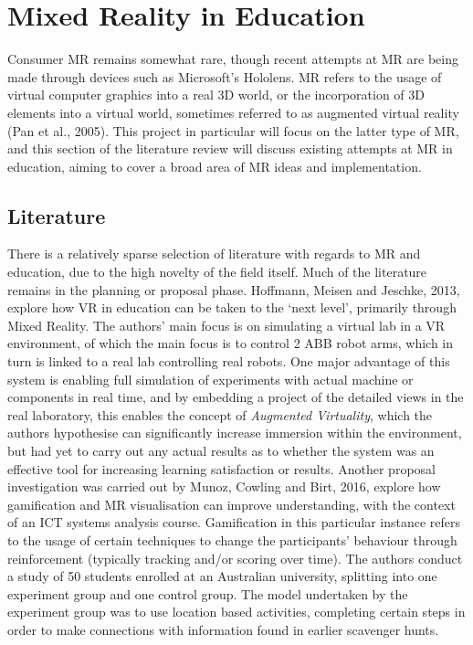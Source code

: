 \documentclass[11pt]{report}
\begin{document}
\section{Mixed Reality in Education}
Consumer MR remains somewhat rare, though recent attempts at MR are being made through devices such as Microsoft's Hololens. MR refers to the usage of virtual computer graphics into a real 3D world, or the incorporation of 3D elements into a virtual world, sometimes referred to as augmented virtual reality (Pan et al., 2005). This project in particular will focus on the latter type of MR, and this section of the literature review will discuss existing attempts at MR in education, aiming to cover a broad area of MR ideas and implementation.
\subsection{Literature}
There is a relatively sparse selection of literature with regards to MR and education, due to the high novelty of the field itself. Much of the literature remains in the planning or proposal phase. Hoffmann, Meisen and Jeschke, 2013, explore how VR in education can be taken to the `next level', primarily through Mixed Reality. The authors' main focus is on simulating a virtual lab in a VR environment, of which the main focus is to control 2 ABB robot arms, which in turn is linked to a real lab controlling real robots. One major advantage of this system is enabling full simulation of experiments with actual machine or components in real time, and by embedding a project of the detailed views in the real laboratory, this enables the concept of \textit{Augmented Virtuality}, which the authors hypothesise can significantly increase immersion within the environment, but had yet to carry out any actual results as to whether the system was an effective tool for increasing learning satisfaction or results. Another proposal investigation was carried out by 
Munoz, Cowling and Birt, 2016, explore how gamification and MR visualisation can improve understanding, with the context of an ICT systems analysis course. Gamification in this particular instance refers to the usage of certain techniques to change the participants' behaviour through reinforcement (typically tracking and/or scoring over time). The authors conduct a study of 50 students enrolled at an Australian university, splitting into one experiment group and one control group. The model undertaken by the experiment group was to use location based activities, completing certain steps in order to make connections with information found in earlier scavenger hunts.
\end{document}
